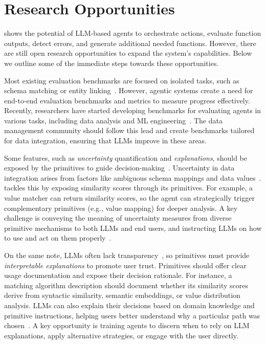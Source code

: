 \section{Research Opportunities}
\label{sec:research-agenda}

\systemname shows the potential of LLM-based agents to orchestrate actions, evaluate function outputs, detect errors, and generate additional needed functions. However, there are still open research opportunities to expand the system's capabilities.
Below we outline some of the immediate steps towards these opportunities.


Most existing evaluation benchmarks are focused on isolated tasks, such as schema matching or entity linking~\cite{koutras2021valentine, liu2024magneto, wang2021machamp}. 
However, agentic systems create a need for end-to-end evaluation benchmarks and metrics to measure progress effectively. Recently, researchers have started developing benchmarks for evaluating agents in various tasks, including data analysis and ML engineering~\cite{chan2024mle, hu2024infiagent, zhang2024benchmarking, huang2024mlagentbench}. 
The data management community should follow this lead and create benchmarks tailored for data integration, ensuring that LLMs improve in these areas.


\label{sec:proposed-primitives}
Some features, such as \emph{uncertainty} quantification and \emph{explanations}, should be exposed by the primitives to guide decision-making~\cite{uncertainty2009}.
Uncertainty in data integration arises from factors like ambiguous schema mappings and data values~\cite{WangHM2018}. \systemname tackles this by exposing similarity scores through its primitives. For example, a value matcher can return similarity scores, so the agent can strategically trigger complementary primitives (e.g., value mapping) for deeper analysis. A key challenge is conveying the meaning of uncertainty measures from diverse primitive mechanisms to both LLMs and end users, and instructing LLMs on how to use and act on them properly~\cite{dagstuhl2029explanation}.

On the same note, LLMs often lack transparency~\cite{pmlr-v235-huang24x}, so primitives must provide \textit{interpretable explanations} to promote user trust. Primitives should offer clear usage documentation and expose their decision rationale. For instance, a matching algorithm description should document whether its similarity scores derive from syntactic similarity, semantic embeddings, or value distribution analysis. LLMs can also explain their decisions based on domain knowledge and primitive instructions, helping users better understand why a particular path was chosen~\cite{explainability2024,TableMeetsLLM2024}. A key opportunity is training agents to discern when to rely on LLM explanations, apply alternative strategies, or engage with the user directly.

